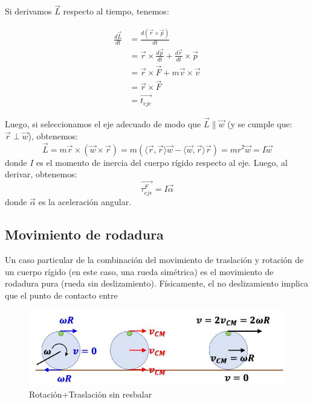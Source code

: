 \documentclass[10pt]{article}
\begin{document}
Si derivamos $\vec{L}$ respecto al tiempo, tenemos:

$$
\begin{aligned}
\frac{d \vec{L}}{d t} & =\frac{d(\vec{r} \times \vec{p})}{d t} \\
& =\vec{r} \times \frac{d \vec{p}}{d t}+\frac{d \vec{r}}{d t} \times \vec{p} \\
& =\vec{r} \times \vec{F}+m \vec{v} \times \vec{v} \\
& =\vec{r} \times \vec{F} \\
& =\overrightarrow{t_{e j e}}
\end{aligned}
$$


Luego, si seleccionamos el eje adecuado de modo que $\vec{L} \| \vec{w}$ (y se cumple que: $\vec{r} \perp \vec{w}$), obtenemos:
\[
\vec{L} = m \vec{r} \times (\vec{w} \times \vec{r}) = m (\langle \vec{r}, \vec{r} \rangle \vec{w} - \langle \vec{w}, \vec{r} \rangle \vec{r}) = m r^{2} \vec{w} = I \vec{w}
\]
donde $I$ es el momento de inercia del cuerpo rígido respecto al eje. Luego, al derivar, obtenemos:
\[
\overrightarrow{\tau_{e j e}^{F}} = I \vec{\alpha}
\]
donde $\vec{\alpha}$ es la aceleración angular.
\subsection{ Movimiento de rodadura}

Un caso particular de la combinación del movimiento de traslación y rotación de un cuerpo rígido (en este caso, una rueda simétrica) es el movimiento de rodadura pura (rueda sin deslizamiento). Físicamente, el no deslizamiento implica que el punto de contacto entre
\begin{figure}[H]
    \centering
\includegraphics[scale = 0.30, center]{2025_04_01_ea720b93e8ebb5d0c6aeg-08(1)}
\caption{Rotación+Traslación sin resbalar}
\end{figure}
\end{document}
